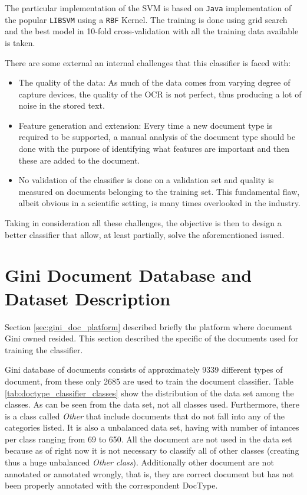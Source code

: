 The particular implementation of the \ac{SVM} is based on \texttt{Java}
implementation of the popular \texttt{LIBSVM} \cite{CC01a} using a
\texttt{RBF} Kernel.  The training is done using grid search and the best
model in 10-fold cross-validation with all the training data available is
taken.

There are some external an internal challenges that this classifier is faced
with:

\begin{itemize}
\item The quality of the data: As much of the data comes from varying degree
  of capture devices, the quality of the OCR is not perfect, thus producing a
  lot of noise in the stored text.
\item Feature generation and extension: Every time a new document type is
  required to be supported, a manual analysis of the document type should be
  done with the purpose of identifying what features are important and then
  these are added to the document.
\item No validation of the classifier is done on a validation set and quality
  is measured on documents belonging to the training set. This fundamental
  flaw, albeit obvious in a scientific setting, is many times overlooked in
  the industry.
\end{itemize}

Taking in consideration all these challenges, the objective is then to design
a better classifier that allow, at least partially, solve the
aforementioned issued.

\section{Gini Document Database and Dataset Description}
\label{sec:gini_db_dataset_desc}
  
Section \ref{sec:gini_doc_platform} described briefly the platform where
document Gini owned resided. This section described the specific of the
documents used for training the classifier. 

Gini database of documents consists of approximately 9339 different types of
document, from these only 2685 are used to train the document classifier.
Table \ref{tab:doctype_classifier_classes} show the distribution of the data
set among the classes. As can be seen from the data set, not all classes
used. Furthermore, there is a class called \textit{Other} that include
documents that do not fall into any of the categories listed. It is also a
unbalanced data set, having with number of intances per class ranging from 69
to 650. All the document are not used in the data set because as of right now
it is not necessary to classify all of other classes (creating thus a huge
unbalanced \textit{Other class}). Additionally other document are not
annotated or annotated wrongly, that is, they are correct document but has
not been properly annotated with the correspondent \ac{DocType}.


